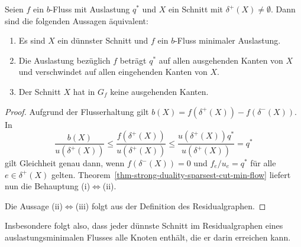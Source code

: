 \begin{corollary}\label{cor-easy-characterization-sparsest-cut}
	Seien $f$ ein $b$-Fluss mit Auslastung $q^*$ und $X$ ein Schnitt mit $\delta^+(X)\neq \emptyset$.
	Dann sind die folgenden Aussagen äquivalent:
	\begin{enumerate}[label=(\roman*)]
		\item Es sind $X$ ein dünnster Schnitt und $f$ ein $b$-Fluss minimaler Auslastung.
		\item Die Auslastung bezüglich $f$ beträgt $q^*$ auf allen ausgehenden Kanten von $X$ und verschwindet auf allen eingehenden Kanten von $X$.
		\item Der Schnitt $X$ hat in $G_f$ keine ausgehenden Kanten.
	\end{enumerate}
\end{corollary}
\begin{proof}
	Aufgrund der Flusserhaltung gilt $b(X) = f(\delta^+(X)) - f(\delta^-(X))$.
	In \[
	\frac{b(X)}{u(\delta^+(X))} \leq \frac{f(\delta^+(X))}{u(\delta^+(X))} \leq \frac{u(\delta^+(X)) q^*}{u(\delta^+(X))} = q^*
	\]
	gilt Gleichheit genau dann, wenn $f(\delta^-(X))=0$ und $f_{e}/u_{e} = q^*$ für alle $e\in\delta^+(X)$ gelten.
	Theorem~\ref{thm-strong-duality-sparsest-cut-min-flow} liefert nun die Behauptung (i)$\Leftrightarrow$(ii).
	
	Die Aussage (ii)$\Leftrightarrow$(iii) folgt aus der Definition des Residualgraphen.
\end{proof}

Insbesondere folgt also, dass jeder dünnste Schnitt im Residualgraphen eines auslastungsminimalen Flusses alle Knoten enthält, die er darin erreichen kann.

